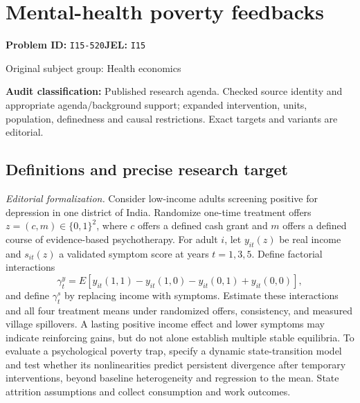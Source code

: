 \documentclass[11pt,a4paper]{article}
\begin{document}
\section*{Mental-health poverty feedbacks}
\textbf{Problem ID:} \texttt{I15-520}\quad \textbf{JEL:} \texttt{I15}\par
\label{problem:OP-0448}
{\sffamily\small\color{muted}Original subject group: Health economics\par}
\label{definitions:problem:30007730}
\textbf{Audit classification:} Published research agenda. Checked source identity and appropriate agenda/background support; expanded intervention, units, population, definedness and causal restrictions. Exact targets and variants are editorial.
\subsection*{Definitions and precise research target}
\textit{Editorial formalization.} Consider low-income adults screening positive for depression in one district of India. Randomize one-time treatment offers \(z=(c,m)\in\{0,1\}^2\), where \(c\) offers a defined cash grant and \(m\) offers a defined course of evidence-based psychotherapy. For adult \(i\), let \(y_{it}(z)\) be real income and \(s_{it}(z)\) a validated symptom score at years \(t=1,3,5\). Define factorial interactions
\[\gamma_t^y=E[y_{it}(1,1)-y_{it}(1,0)-y_{it}(0,1)+y_{it}(0,0)],\]
and define \(\gamma_t^s\) by replacing income with symptoms. Estimate these interactions and all four treatment means under randomized offers, consistency, and measured village spillovers. A lasting positive income effect and lower symptoms may indicate reinforcing gains, but do not alone establish multiple stable equilibria. To evaluate a psychological poverty trap, specify a dynamic state-transition model and test whether its nonlinearities predict persistent divergence after temporary interventions, beyond baseline heterogeneity and regression to the mean. State attrition assumptions and collect consumption and work outcomes.
\end{document}
